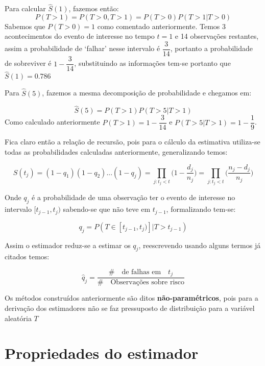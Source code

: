 \documentclass[
  letterpaper,
  DIV=11,
  numbers=noendperiod]{scrreprt}
\begin{document}
Para calcular \(\hat{S}(1)\), fazemos então: \[
P(T>1) = P(T>0,T>1) = P(T>0)P(T>1 |T>0)
\] Sabemos que \(P(T>0) = 1\) como comentado anteriormente. Temos 3
acontecimentos do evento de interesse no tempo \(t=1\) e 14 observações
restantes, assim a probabilidade de `falhar' nesse intervalo é
\(\dfrac{3}{14}\), portanto a probabilidade de sobreviver é
\(1 - \dfrac{3}{14}\), substituindo as informações tem-se portanto que
\(\hat{S}(1) = 0.786\)

Para \(\hat{S}(5)\), fazemos a mesma decomposição de probabilidade e
chegamos em:

\[
\hat{S}(5) =  P(T>1)P(T>5|T>1)
\] Como calculado anteriormente \(P(T>1) = 1-\dfrac{3}{14}\) e
\(P(T>5|T>1) = 1 - \dfrac{1}{9}\).

Fica claro então a relação de recursão, pois para o cálculo da
estimativa utiliza-se todas as probabilidades calculadas anteriormente,
generalizando temos:

\[
S(t_j) =(1-q_1)(1-q_2)...(1-q_j) =  \prod_{j:t_j<t} \bigg(1 - \dfrac{d_j}{n_j}\bigg) = \prod_{j:t_j<t} \bigg(\dfrac{n_j - d_j}{n_j}\bigg)
\]

Onde \(q_j\) é a probabilidade de uma observação ter o evento de
interesse no intervalo \([t_{j-1},t_j)\) sabendo-se que não teve em
\(t_{j-1}\), formalizando tem-se:

\[
q_j = P(T \in [t_{j-1},t_j)] | T> t_{j-1}) 
\]

Assim o estimador reduz-se a estimar os \(q_j\), reescrevendo usando
alguns termos já citados temos:

\[
\hat{q}_j = \dfrac{\# \quad \text{de falhas em} \quad t_j}{\# \quad  \text{Observações sobre risco}}
\]

\begin{tcolorbox}[standard jigsaw,opacityback=0, bottomtitle=1mm, titlerule=0mm, rightrule=.15mm, toprule=.15mm, opacitybacktitle=0.6, title=\textcolor{quarto-callout-important-color}{\faExclamation}\hspace{0.5em}{Importante}, arc=.35mm, colbacktitle=quarto-callout-important-color!10!white, bottomrule=.15mm, toptitle=1mm, leftrule=.75mm, left=2mm, colframe=quarto-callout-important-color-frame, coltitle=black, colback=white]
Os métodos construídos anteriormente são ditos
\textbf{não-paramétricos}, pois para a derivação dos estimadores não se
faz pressuposto de distribuição para a variável aleatória \(T\)
\end{tcolorbox}

\hypertarget{propriedades-do-estimador}{%
\section{Propriedades do estimador}\label{propriedades-do-estimador}}
\end{document}

